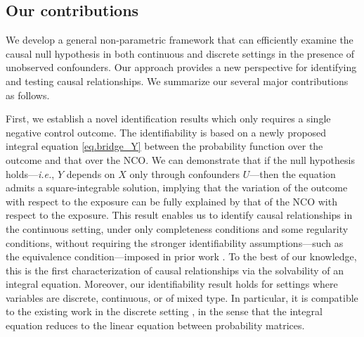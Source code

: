 \documentclass[
  12pt]{article}
\begin{document}



\subsection{Our contributions}
\label{sec.intro-contribution}

We develop a general non-parametric framework that can efficiently examine the causal null hypothesis in both continuous and discrete settings in the presence of unobserved confounders. Our approach provides a new perspective for identifying and testing causal relationships. We summarize our several major contributions as follows.

First, we establish a novel identification results which only requires a single negative control outcome. The identifiability is based on a newly proposed integral equation \eqref{eq.bridge_Y} between the probability function over the outcome and that over the NCO. We can demonstrate that if the null hypothesis holds—\emph{i.e.}, $Y$ depends on $X$ only through confounders $U$—then the equation admits a square-integrable solution, implying that the variation of the outcome with respect to the exposure can be fully explained by that of the NCO with respect to the exposure. This result enables us to identify causal relationships in the continuous setting, under only completeness conditions and some regularity conditions, without requiring the stronger identifiability assumptions—such as the equivalence condition—imposed in prior work \citep{miao2023identifying}. To the best of our knowledge, this is the first characterization of causal relationships via the solvability of an integral equation. Moreover, our identifiability result holds for settings where variables are discrete, continuous, or of mixed type. In particular, it is compatible to the existing work in the discrete setting \citep{miao2018identifying}, in the sense that the integral equation reduces to the linear equation between probability matrices.  

\end{document}
